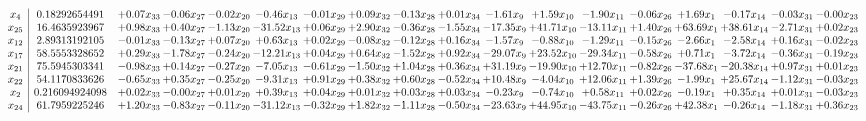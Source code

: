 \documentclass[9pt]{article}
\begin{document}
 \[\begin{array}{c| c c@{\hskip 2pt} c@{\hskip 2pt} c@{\hskip 2pt} c@{\hskip 2pt} c@{\hskip 2pt} c@{\hskip 2pt} c@{\hskip 2pt} c@{\hskip 2pt} c@{\hskip 2pt} c@{\hskip 2pt} c@{\hskip 2pt} c@{\hskip 2pt} c@{\hskip 2pt} c@{\hskip 2pt} c@{\hskip 2pt} c@{\hskip 2pt} }
 x_{4}   &  0.18292654491 & +  0.07 x_{33} & -0.06 x_{27} & -0.02 x_{20} & -0.46 x_{13} & -0.01 x_{29} & +  0.09 x_{32} & -0.13 x_{28} & +  0.01 x_{34} & -1.61 x_{9} & +  1.59 x_{10} & -1.90 x_{11} & -0.06 x_{26} & +  1.69 x_{1} & -0.17 x_{14} & -0.03 x_{31} & -0.00 x_{23}\\
 x_{25}   &  16.4635923967 & +  0.98 x_{33} & +  0.40 x_{27} & -1.13 x_{20} & -31.52 x_{13} & +  0.06 x_{29} & +  2.90 x_{32} & -0.36 x_{28} & -1.55 x_{34} & -17.35 x_{9} & + 41.71 x_{10} & -13.11 x_{11} & +  1.40 x_{26} & + 63.69 x_{1} & + 38.61 x_{14} & -2.71 x_{31} & +  0.02 x_{23}\\
 x_{12}   &  2.89313192105 & -0.01 x_{33} & -0.13 x_{27} & +  0.07 x_{20} & +  0.63 x_{13} & +  0.02 x_{29} & -0.08 x_{32} & -0.12 x_{28} & +  0.16 x_{34} & -1.57 x_{9} & -0.88 x_{10} & -1.29 x_{11} & -0.15 x_{26} & -2.66 x_{1} & -2.58 x_{14} & +  0.16 x_{31} & -0.02 x_{23}\\
 x_{17}   &  58.5553328652 & +  0.29 x_{33} & -1.78 x_{27} & -0.24 x_{20} & -12.21 x_{13} & +  0.04 x_{29} & +  0.64 x_{32} & -1.52 x_{28} & +  0.92 x_{34} & -29.07 x_{9} & + 23.52 x_{10} & -29.34 x_{11} & -0.58 x_{26} & +  0.71 x_{1} & -3.72 x_{14} & -0.36 x_{31} & -0.19 x_{23}\\
 x_{21}   &  75.5945303341 & -0.98 x_{33} & +  0.14 x_{27} & -0.27 x_{20} & -7.05 x_{13} & -0.61 x_{29} & -1.50 x_{32} & +  1.04 x_{28} & +  0.36 x_{34} & + 31.19 x_{9} & -19.90 x_{10} & + 12.70 x_{11} & -0.82 x_{26} & -37.68 x_{1} & -20.38 x_{14} & +  0.97 x_{31} & +  0.01 x_{23}\\
 x_{22}   &  54.1170833626 & -0.65 x_{33} & +  0.35 x_{27} & -0.25 x_{20} & -9.31 x_{13} & +  0.91 x_{29} & +  0.38 x_{32} & +  0.60 x_{28} & -0.52 x_{34} & + 10.48 x_{9} & -4.04 x_{10} & + 12.06 x_{11} & +  1.39 x_{26} & -1.99 x_{1} & + 25.67 x_{14} & -1.12 x_{31} & -0.03 x_{23}\\
 x_{2}   &  0.216094924098 & +  0.02 x_{33} & -0.00 x_{27} & +  0.01 x_{20} & +  0.39 x_{13} & +  0.04 x_{29} & +  0.01 x_{32} & +  0.03 x_{28} & +  0.03 x_{34} & -0.23 x_{9} & -0.74 x_{10} & +  0.58 x_{11} & +  0.02 x_{26} & -0.19 x_{1} & +  0.35 x_{14} & +  0.01 x_{31} & -0.03 x_{23}\\
 x_{24}   &  61.7959225246 & +  1.20 x_{33} & -0.83 x_{27} & -0.11 x_{20} & -31.12 x_{13} & -0.32 x_{29} & +  1.82 x_{32} & -1.11 x_{28} & -0.50 x_{34} & -23.63 x_{9} & + 44.95 x_{10} & -43.75 x_{11} & -0.26 x_{26} & + 42.38 x_{1} & -0.26 x_{14} & -1.18 x_{31} & +  0.36 x_{23}\\

\end{array}\]
\end{document}
